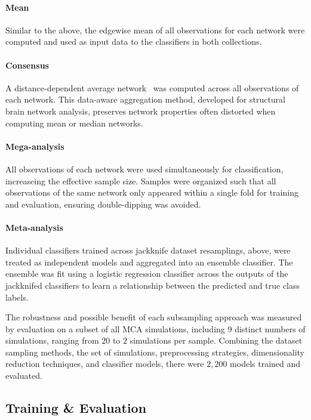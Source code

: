 \documentclass[10pt]{SelfArx} %
\begin{document}
\paragraph{Mean} Similar to the above, the edgewise mean of all observations for each network were computed and used
as input data to the classifiers in both collections.

\paragraph{Consensus} A distance-dependent average network~\cite{Betzel2018-eo} was computed across all observations
of each network. This data-aware aggregation method, developed for structural brain network analysis, preserves network
properties often distorted when computing mean or median networks.

\paragraph{Mega-analysis} All observations of each network were used simultaneously for classification, increaseing
the effective sample size. Samples were organized such that all observations of the same network only appeared within a
single fold for training and evaluation, ensuring double-dipping was avoided.

\paragraph{Meta-analysis} Individual classifiers trained across jackknife dataset resamplings, above, were treated as
independent models and aggregated into an ensemble classifier. The ensemble was fit using a logistic regression
classifier across the outputs of the jackknifed classifiers to learn a relationship between the predicted and true
class labels.

The robustness and possible benefit of each subsampling approach was measured by evaluation on a subset of all MCA
simulations, including $9$ distinct numbers of simulations, ranging from $20$ to $2$ simulations per sample. Combining
the dataset sampling methods, the set of simulations, preprocessing strategies, dimensionality reduction techniques,
and classifier models, there were $2,200$ models trained and evaluated.

\subsection*{Training \& Evaluation}
\end{document}
